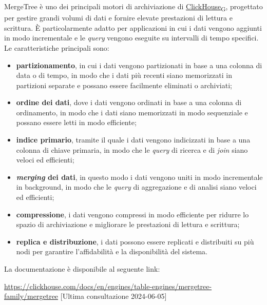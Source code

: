 MergeTree è uno dei principali motori di archiviazione di \href{https://7last.github.io/docs/pb/documentazione-interna/glossario\#clickhouse}{ClickHouse\textsubscript{G}}, progettato per gestire grandi volumi di dati e fornire elevate prestazioni di lettura e scrittura. È particolarmente adatto per applicazioni in cui i dati vengono aggiunti in modo incrementale e le \textit{query} vengono eseguite su intervalli di tempo specifici.
Le caratteristiche principali sono:
\begin{itemize}
	\item \textbf{partizionamento}, in cui i dati vengono partizionati in base a una colonna di data o di tempo, in modo che i dati più recenti siano memorizzati in partizioni separate e possano essere facilmente eliminati o archiviati;
	\item \textbf{ordine dei dati}, dove i dati vengono ordinati in base a una colonna di ordinamento, in modo che i dati siano memorizzati in modo sequenziale e possano essere letti in modo efficiente;
	\item \textbf{indice primario}, tramite il quale i dati vengono indicizzati in base a una colonna di chiave primaria, in modo che le \textit{query} di ricerca e di \textit{join} siano veloci ed efficienti;
	\item \textbf{\textit{merging} dei dati}, in questo modo i dati vengono uniti in modo incrementale in background, in modo che le \textit{query} di aggregazione e di analisi siano veloci ed efficienti;
	\item \textbf{compressione}, i dati vengono compressi in modo efficiente per ridurre lo spazio di archiviazione e migliorare le prestazioni di lettura e scrittura;
	\item \textbf{replica e distribuzione}, i dati possono essere replicati e distribuiti su più nodi per garantire l'affidabilità e la disponibilità del sistema.
\end{itemize}

La documentazione è disponibile al seguente link:
\begin{center}
	\url{https://clickhouse.com/docs/en/engines/table-engines/mergetree-family/mergetree} [Ultima consultazione 2024-06-05]
\end{center}

